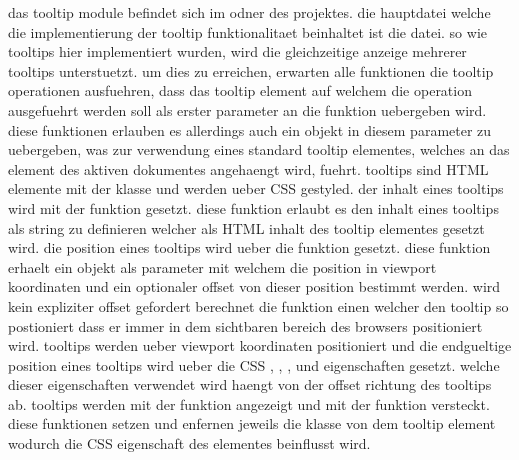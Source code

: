   
das tooltip module befindet sich im  odner des projektes.
die hauptdatei welche die implementierung der tooltip funktionalitaet beinhaltet ist die  datei.
so wie tooltips hier implementiert wurden, wird die gleichzeitige anzeige mehrerer tooltips unterstuetzt.
um dies zu erreichen, erwarten alle funktionen die tooltip operationen ausfuehren, dass das tooltip element auf welchem die operation ausgefuehrt werden soll als erster parameter an die funktion uebergeben wird.
diese funktionen erlauben es allerdings auch ein  objekt in diesem parameter zu uebergeben, was zur verwendung eines standard tooltip elementes, welches an das  element des aktiven dokumentes angehaengt wird, fuehrt.
%
tooltips sind HTML  elemente mit der  klasse und werden ueber CSS gestyled.
der inhalt eines tooltips wird mit der  funktion gesetzt.
diese funktion erlaubt es den inhalt eines tooltips als string zu definieren welcher als HTML inhalt des tooltip elementes gesetzt wird.
%
die position eines tooltips wird ueber die  funktion gesetzt.
diese funktion erhaelt ein objekt als parameter mit welchem die position in viewport koordinaten und ein optionaler offset von dieser position bestimmt werden.
wird kein expliziter offset gefordert berechnet die  funktion einen welcher den tooltip so postioniert dass er immer in dem sichtbaren bereich des browsers positioniert wird.
tooltips werden ueber viewport koordinaten positioniert und die endgueltige position eines tooltips wird ueber die CSS , , , und  eigenschaften gesetzt.
welche dieser eigenschaften verwendet wird haengt von der offset richtung des tooltips ab. 
%
tooltips werden mit der  funktion angezeigt und mit der  funktion versteckt.
diese funktionen setzen und enfernen jeweils die  klasse von dem tooltip element wodurch die CSS  eigenschaft des elementes beinflusst wird. 

